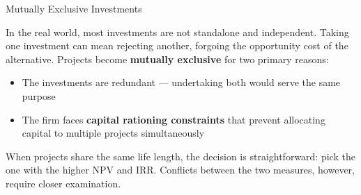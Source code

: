 \documentclass[10pt]{article}
\begin{document}
    \begin{core}{Mutually Exclusive Investments}

      In the real world, most investments are not standalone and independent. Taking one investment can mean rejecting another, forgoing the opportunity cost of the alternative. Projects become \textbf{mutually exclusive} for two primary reasons:

      \begin{itemize}

        \item The investments are redundant — undertaking both would serve the same purpose

        \item The firm faces \textbf{capital rationing constraints} that prevent allocating capital to multiple projects simultaneously

      \end{itemize}

      When projects share the same life length, the decision is straightforward: pick the one with the higher NPV and IRR. Conflicts between the two measures, however, require closer examination.


    \end{core}
\end{document}
